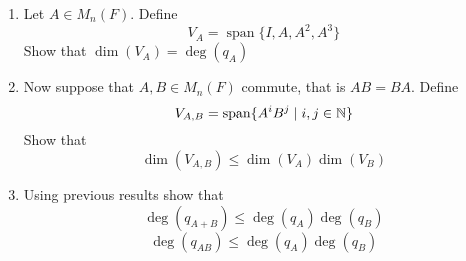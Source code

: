 \documentclass[12pt]{amsart}
\DeclareMathOperator{\spn}{span}
\begin{document}
	
	\begin{enumerate}
		\item Let $A \in M_n(F)$. Define $$V_A = \spn\{I, A, A^2, A^3\}$$ 
		Show that $\dim(V_A) = \deg(q_A)$
		\item Now suppose that $A,B  \in M_n(F)$ commute, that is  $AB = BA$. Define $$V_{A,B} = \spn\{A^i B^j \mid i,j \in \N\}$$ Show that $$\dim(V_{A,B}) \leq \dim(V_A) \dim(V_B)$$
		\item Using previous results show that
	$$ \deg(q_{A+B}) \leq \deg(q_A) \deg(q_B) $$
	$$ \deg(q_{AB}) \leq \deg(q_A) \deg(q_B) $$
	\end{enumerate}
\end{document}
